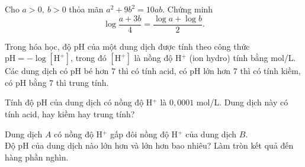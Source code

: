 \begin{vd}
	Cho $a>0,~b>0$ thỏa mãn $a^2+9b^2=10ab$. Chứng minh $$\log \dfrac{a+3b}{4}=\dfrac{\log a+\log b}{2}.$$
\end{vd} 

\begin{vd}%
	Trong hóa học, độ  pH  của một dung dịch được tính theo công thức $\text{pH}=-\log[\text{H}^+] $, trong đó $ [\text{H}^+] $ là nồng độ  H$^+ $ (ion hydro) tính bằng mol/L. Các dung dịch có  pH  bé hơn $ 7 $ thì có tính acid, có pH  lớn hơn $ 7 $ thì có tính kiềm, có  pH  bằng $ 7 $ thì trung tính.
	\begin{listEX}[1]
		\item[a)] Tính độ  pH  của dung dịch có nồng độ H$^+ $ là $ 0{,}0001 $ mol/L. Dung dịch này có tính acid, hay kiềm hay trung tính?
		\item[b)] Dung dịch $ A $ có nồng độ  H$^+ $ gấp đôi nồng độ  H$^+ $ của dung dịch $ B $.\\
		Độ pH  của dung dịch nào lớn hơn và lớn hơn bao nhiêu? Làm tròn kết quả đến hàng phần nghìn.
	\end{listEX}
\end{vd} 


